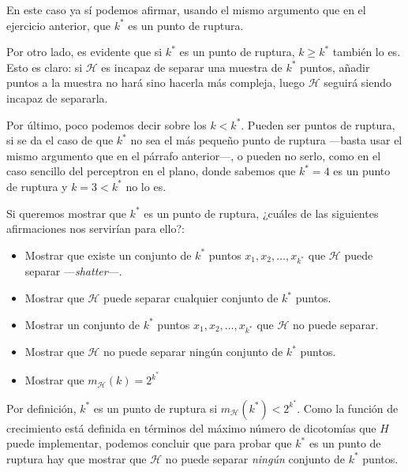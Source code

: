 \documentclass[a4paper, 11pt]{article}
\begin{document}
    \begin{solucion}
        En este caso ya sí podemos afirmar, usando el mismo argumento que en el ejercicio anterior, que $k^*$ es un punto de ruptura.

        Por otro lado, es evidente que si $k^*$ es un punto de ruptura, $k \geq k^*$ también lo es. Esto es claro: si $\mathcal{H}$ es incapaz de separar una muestra de $k^*$ puntos, añadir puntos a la muestra no hará sino hacerla más compleja, luego $\mathcal{H}$ seguirá siendo incapaz de separarla.

        Por último, poco podemos decir sobre los $k < k^*$. Pueden ser puntos de ruptura, si se da el caso de que $k^*$ no sea el más pequeño punto de ruptura ---basta usar el mismo argumento que en el párrafo anterior---, o pueden no serlo, como en el caso sencillo del perceptron en el plano, donde sabemos que $k^* = 4$ es un punto de ruptura y $k = 3 < k^*$ no lo es.
    \end{solucion}



    \begin{ejercicio}
        Si queremos mostrar que $k^*$ es un punto de ruptura, ¿cuáles de las siguientes afirmaciones nos servirían para ello?:
        \begin{itemize}
            \item Mostrar que existe un conjunto de $k^*$ puntos $x_1, x_2 , \dots , x_{k^*}$ que $\mathcal{H}$ puede separar ---\emph{shatter}---.
            \item Mostrar que $\mathcal{H}$ puede separar cualquier conjunto de $k^*$ puntos.
            \item Mostrar un conjunto de $k^*$ puntos $x_1, x_2 , \dots , x_{k^*}$ que $\mathcal{H}$ no puede separar.
            \item Mostrar que $\mathcal{H}$ no puede separar ningún conjunto de $k^*$ puntos.
            \item Mostrar que $m_\mathcal{H} (k) = 2^{k^*}$
        \end{itemize}
    \end{ejercicio}

    \begin{solucion}
        Por definición, $k^*$ es un punto de ruptura si $m_\mathcal{H}(k^*) < 2^{k^*}$. Como la función de crecimiento está definida en términos del máximo número de dicotomías que $H$ puede implementar, podemos concluir que para probar que $k^*$ es un punto de ruptura hay que mostrar que $\mathcal{H}$ no puede separar \emph{ningún} conjunto de $k^*$ puntos.
    \end{solucion}
\end{document}
